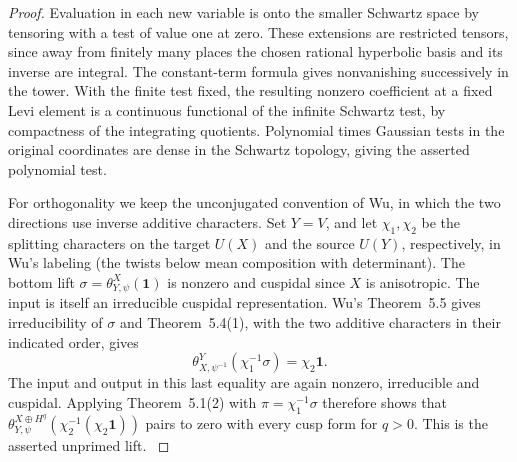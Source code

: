 \begin{proof}
Evaluation in each new variable is onto the smaller Schwartz
space by tensoring with a test of value one at zero. These extensions
are restricted tensors, since away from finitely many places the
chosen rational hyperbolic basis and its inverse are integral. The
constant-term formula gives nonvanishing successively in the tower.
With the finite test fixed, the resulting nonzero coefficient at
a fixed Levi element is a continuous functional of the infinite
Schwartz test, by compactness of the integrating quotients.
Polynomial times Gaussian tests in the original coordinates are
dense in the Schwartz topology, giving the asserted polynomial test.

For orthogonality we keep the unconjugated convention of Wu, in which
the two directions use inverse additive characters. Set
\(Y=V\), and let \(\chi_1,\chi_2\) be the splitting characters on
the target \(U(X)\) and the source \(U(Y)\), respectively, in
Wu's labeling (the twists below mean composition with determinant).
The bottom lift \(\sigma=\theta^X_{Y,\psi}(\mathbf1)\) is nonzero
and cuspidal since \(X\) is anisotropic. The input is itself an
irreducible cuspidal representation. Wu's Theorem~5.5 gives
irreducibility of \(\sigma\) and Theorem~5.4(1), with the two
additive characters in their indicated order, gives
\[
 \theta^Y_{X,\psi^{-1}}(\chi_1^{-1}\sigma)=\chi_2\mathbf1.
\]
The input and output in this last equality are again nonzero,
irreducible and cuspidal. Applying Theorem~5.1(2) with
\(\pi=\chi_1^{-1}\sigma\) therefore shows that
\(\theta^{X\oplus H^q}_{Y,\psi}
 (\chi_2^{-1}(\chi_2\mathbf1))\) pairs to zero with every cusp
form for \(q>0\). This is the asserted unprimed lift.
\cite[Theorems~5.1, 5.4 and 5.5]{wuThetaTower}
\end{proof}

